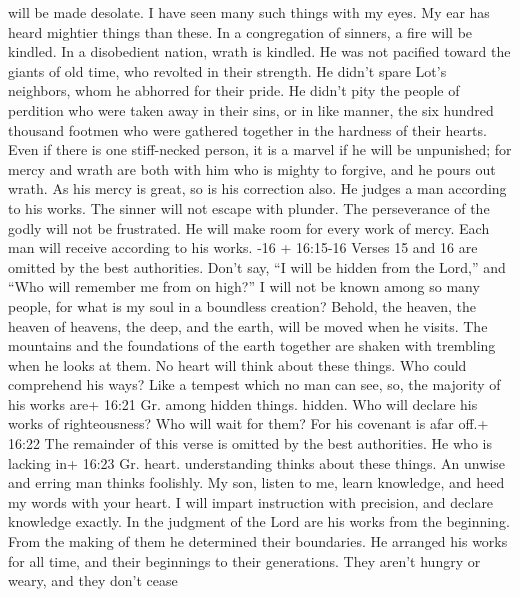 will be made desolate.  I have seen many such things with my
eyes. My ear has heard mightier things than these.  In a
congregation of sinners, a fire will be kindled. In a disobedient
nation, wrath is kindled.  He was not pacified toward the
giants of old time, who revolted in their strength.  He
didn't spare Lot's neighbors, whom he abhorred for their pride.
 He didn't pity the people of perdition who were taken away
in their sins,  or in like manner, the six hundred thousand
footmen who were gathered together in the hardness of their hearts.
 Even if there is one stiff-necked person, it is a marvel
if he will be unpunished; for mercy and wrath are both with him who is
mighty to forgive, and he pours out wrath.  As his mercy is
great, so is his correction also. He judges a man according to his
works.  The sinner will not escape with plunder. The
perseverance of the godly will not be frustrated.  He will
make room for every work of mercy. Each man will receive according to
his works. -16 + 16:15-16 Verses 15 and 16 are omitted by
the best authorities.  Don't say, ``I will be hidden from
the Lord,'' and ``Who will remember me from on high?'' I will not be
known among so many people, for what is my soul in a boundless creation?
 Behold, the heaven, the heaven of heavens, the deep, and
the earth, will be moved when he visits.  The mountains and
the foundations of the earth together are shaken with trembling when he
looks at them.  No heart will think about these things. Who
could comprehend his ways?  Like a tempest which no man can
see, so, the majority of his works are+ 16:21 Gr. among hidden things.
hidden.  Who will declare his works of righteousness? Who
will wait for them? For his covenant is afar off.+ 16:22 The remainder
of this verse is omitted by the best authorities.  He who
is lacking in+ 16:23 Gr. heart. understanding thinks about these things.
An unwise and erring man thinks foolishly.  My son, listen
to me, learn knowledge, and heed my words with your heart. 
I will impart instruction with precision, and declare knowledge exactly.
 In the judgment of the Lord are his works from the
beginning. From the making of them he determined their boundaries.
 He arranged his works for all time, and their beginnings
to their generations. They aren't hungry or weary, and they don't cease
